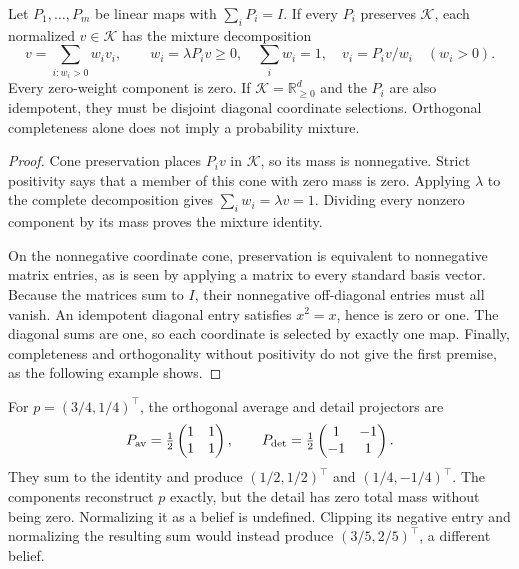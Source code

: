 \begin{proposition}\label{r:positive-packets}
Let $P_1,\ldots,P_m$ be linear maps with $\sum_iP_i=I$. If every $P_i$ preserves $\mathcal K$, each normalized $v\in\mathcal K$ has the mixture decomposition
\[
 v=\sum_{i:w_i>0}w_i v_i,\qquad
 w_i=\lambda P_iv\ge0,\quad \sum_iw_i=1,\quad v_i=P_iv/w_i\quad(w_i>0).
\]
Every zero-weight component is zero. If $\mathcal K=\mathbb R^d_{\ge0}$ and the $P_i$ are also idempotent, they must be disjoint diagonal coordinate selections. Orthogonal completeness alone does not imply a probability mixture.
\end{proposition}
\begin{proof}
Cone preservation places $P_iv$ in $\mathcal K$, so its mass is nonnegative. Strict positivity says that a member of this cone with zero mass is zero. Applying $\lambda$ to the complete decomposition gives $\sum_iw_i=\lambda v=1$. Dividing every nonzero component by its mass proves the mixture identity.

On the nonnegative coordinate cone, preservation is equivalent to nonnegative matrix entries, as is seen by applying a matrix to every standard basis vector. Because the matrices sum to $I$, their nonnegative off-diagonal entries must all vanish. An idempotent diagonal entry satisfies $x^2=x$, hence is zero or one. The diagonal sums are one, so each coordinate is selected by exactly one map. Finally, completeness and orthogonality without positivity do not give the first premise, as the following example shows.
\end{proof}

\begin{counterexample}\label{ce:signed-packet}
For $p=(3/4,1/4)^\top$, the orthogonal average and detail projectors are
\[
 P_{\rm av}=\tfrac12\begin{pmatrix}1&1\\1&1\end{pmatrix},\qquad
 P_{\rm det}=\tfrac12\begin{pmatrix}1&-1\\-1&1\end{pmatrix}.
\]
They sum to the identity and produce $(1/2,1/2)^\top$ and $(1/4,-1/4)^\top$. The components reconstruct $p$ exactly, but the detail has zero total mass without being zero. Normalizing it as a belief is undefined. Clipping its negative entry and normalizing the resulting sum would instead produce $(3/5,2/5)^\top$, a different belief.
\end{counterexample}

